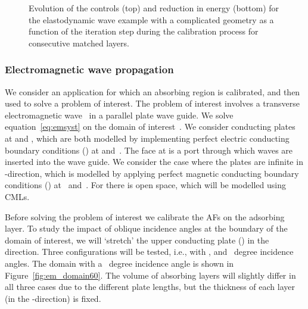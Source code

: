 \documentclass[a4paper]{article}
\begin{document}
\begin{figure}
\begin{minipage}{0.45\textwidth}
   \end{minipage}
  \caption{Evolution of the controls (top) and reduction in energy
    (bottom) for the elastodynamic wave example with a complicated
    geometry as a function of the iteration step during the
    calibration process for consecutive matched layers.}
  \label{fig:arb_history}
\end{figure}

\subsubsection{Electromagnetic wave propagation}
\label{sec:em}

We consider an application for which an absorbing region is
calibrated, and then used to solve a problem of interest.
The problem of interest involves a transverse electromagnetic
wave~\citep{jackson98} in a parallel plate wave guide. We solve
equation~\eqref{eq:emsyst} on the domain of interest~. We consider
conducting plates at  and , which are both modelled by
implementing perfect electric conducting boundary conditions
() at  and~.  The face at
 is a port through which waves are inserted into the wave
guide.  We consider the case where the plates are infinite in
-direction, which is modelled by applying perfect magnetic
conducting boundary conditions () at~ and~.  For  there is open space, which
will be modelled using CMLs.

Before solving the problem of interest we calibrate the AFs on
the adsorbing layer. To study the impact of oblique incidence angles
at the boundary of the domain of interest, we
will `stretch' the upper conducting plate () in the 
direction. Three configurations will be tested, i.e., with , 
and ~degree incidence angles. The domain with a ~degree
incidence angle is shown in Figure~\ref{fig:em_domain60}. The volume
of absorbing layers will slightly differ in all three cases due to the
different plate lengths, but the thickness of each layer (in the
-direction) is fixed.
\end{document}
